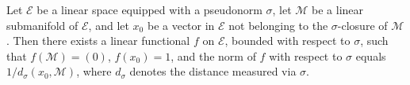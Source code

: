 Let $\mathcal{E}$ be a linear space equipped with a pseudonorm $\sigma$, let $\mathcal{M}$ be a linear submanifold of $\mathcal{E}$, and let $x_0$ be a vector in $\mathcal{E}$ not belonging to the $\sigma$-closure of $\mathcal{M}$. Then there exists a linear functional $f$ on $\mathcal{E}$, bounded with respect to $\sigma$, such that $f(\mathcal{M}) = (0)$, $f(x_0) = 1$, and the norm of $f$ with respect to $\sigma$ equals $1/d_\sigma(x_0, \mathcal{M})$, where $d_\sigma$ denotes the distance measured via $\sigma$.

